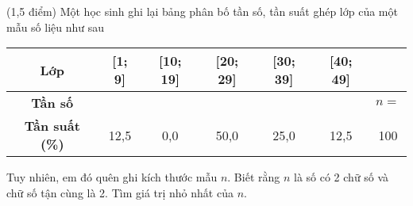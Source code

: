 \begin{bt}%
	(1,5 điểm)
	Một học sinh ghi lại bảng phân bố tần số, tần suất ghép lớp của một mẫu số liệu như sau
	\begin{center}
		\begin{tabular}{|c|c|c|c|c|c|c|}
			\hline
			\bf Lớp  & [1; 9] & [10; 19] & [20; 29] & [30; 39] & [40; 49] & \\
			\hline
			\bf Tần số & & & & & & $n =$\\
			\hline
			\bf Tần suất (\%) & 12,5 & 0,0 & 50,0 & 25,0 & 12,5 & 100\\
			\hline
		\end{tabular}
	\end{center}
	Tuy nhiên, em đó quên ghi kích thước mẫu $n$. Biết rằng $n$ là số có 2 chữ số và chữ số tận cùng là 2. Tìm giá trị nhỏ nhất của $n$.
\end{bt}



